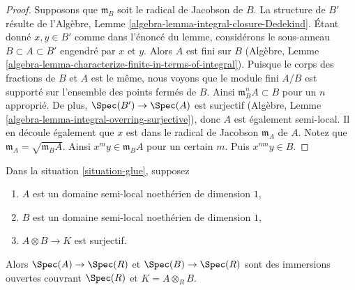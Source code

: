 \begin{proof}
Supposons que $\mathfrak m_B$ soit le radical de Jacobson
de $B$. La structure de $B'$ résulte de l'Algèbre, Lemme
\ref{algebra-lemma-integral-closure-Dedekind}. Étant
donné $x, y \in B'$ comme dans l'énoncé du lemme,
considérons le sous-anneau $B \subset A \subset B'$
engendré par $x$ et $y$. Alors $A$ est fini sur $B$
(Algèbre, Lemme
\ref{algebra-lemma-characterize-finite-in-terms-of-integral}).
Puisque le corps des fractions de $B$ et $A$ est le même, nous
voyons que le module fini $A/B$ est supporté sur l'ensemble des
points fermés de $B$. Ainsi $\mathfrak m_B^n A \subset B$ pour
un $n$ approprié. De plus, $\Spec(B') \to \Spec(A)$ est
surjectif (Algèbre, Lemme
\ref{algebra-lemma-integral-overring-surjective}), donc $A$ est également
semi-local. Il en découle également que $x$ est dans le radical de Jacobson
$\mathfrak m_A$ de $A$. Notez que $\mathfrak m_A = \sqrt{\mathfrak m_B A}$.
Ainsi $x^m y \in \mathfrak m_B A$ pour un certain $m$. Puis $x^{nm} y \in B$.
\end{proof}

\begin{lemma}
\label{lemma-semi-local-both-side}
Dans la situation \ref{situation-glue}, supposez
\begin{enumerate}
\item $A$ est un domaine semi-local noethérien de
dimension $1$, \item $B$ est un domaine semi-local
noethérien de dimension $1$, \item $A \otimes B \to K$ est surjectif.
\end{enumerate}
Alors $\Spec(A) \to \Spec(R)$ et $\Spec(B) \to \Spec(R)$ sont des
immersions ouvertes couvrant $\Spec(R)$ et $K = A \otimes_R B$.
\end{lemma}

